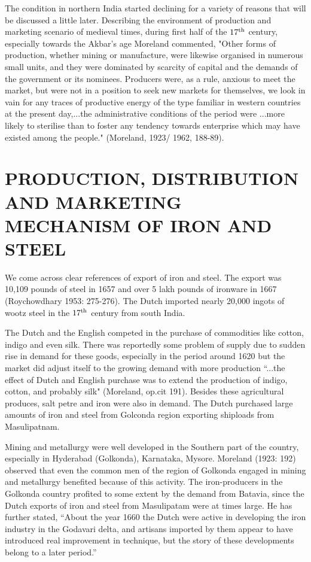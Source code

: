 The condition in northern India started declining for a variety of reasons that will be discussed a little later. Describing the environment of production and marketing scenario of medieval times, during first half of the $17^{\rm th}$ century, especially towards the Akbar's age Moreland commented, "Other forms of production, whether mining or manufacture, were likewise organised in numerous small units, and they were dominated by scarcity of capital and the demands of the government or its nominees. Producers were, as a rule, anxious to meet the market, but were not in a position to seek new markets for themselves, we look in vain for any traces of productive energy of the type familiar in western countries at the present day,...the administrative conditions of the period were ...more likely to sterilise than to foster any tendency towards enterprise which may have existed among the people." (Moreland, 1923/ 1962, 188-89).   

\section*{PRODUCTION, DISTRIBUTION AND MARKETING MECHANISM OF IRON AND STEEL}\label{section-3}

We come across clear references of export of iron and steel. The export was 10,109 pounds of steel in 1657 and over 5 lakh pounds of ironware in 1667 (Roychowdhary 1953: 275-276). The Dutch imported nearly 20,000 ingots of wootz steel in the $17^{\rm th}$ century from south India.

The Dutch and the English competed in the purchase of commodities like cotton, indigo and even silk. There was reportedly some problem of supply due to sudden rise in demand for these goods, especially in the period around 1620 but the market did adjust itself to the growing demand with more production “...the effect of Dutch and English purchase was to extend the production of indigo, cotton, and probably silk" (Moreland, op.cit 191). Besides these agricultural produces, salt petre and iron were also in demand. The Dutch purchased large amounts of iron and steel from Golconda region exporting shiploads from Masulipatnam.

Mining and metallurgy were well developed in the Southern part of the country, especially in Hyderabad (Golkonda), Karnataka, Mysore. Moreland (1923: 192) observed that even the common men of the region of Golkonda engaged in mining and metallurgy benefited because of this activity. The iron-producers in the Golkonda country profited to some extent by the demand from Batavia, since the Dutch exports of iron and steel from Masulipatam were at times large. He has further stated, “About the year 1660 the Dutch were active in developing the iron industry in the Godavari delta, and artisans imported by them appear to have introduced real improvement in technique, but the story of these developments belong to a later period.” 

